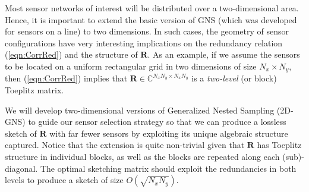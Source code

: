 Most sensor networks of interest will be distributed over a two-dimensional area. Hence, it is important to extend the basic version of GNS (which was developed for sensors on a line) to two dimensions. In such cases, the geometry of sensor configurations have very interesting implications on the redundancy relation (\ref{eqn:CorrRed}) and the structure of $\mathbf{R}$. As an example, if we assume the sensors to be located on a uniform rectangular grid in two dimensions of size $N_x\times N_y$, then (\ref{eqn:CorrRed}) implies that $\mathbf{R}\in \mathbb{C}^{N_xN_y \times N_xN_y}$ is a {\em two-level} (or block) Toeplitz matrix. 

\noindent We will develop two-dimensional versions of Generalized Nested Sampling (2D-GNS) to guide our sensor selection strategy so that we can produce a lossless sketch of $\mathbf{R}$ with far fewer sensors by exploiting its unique algebraic structure captured.%
Notice that the extension is quite non-trivial given that $\mathbf{R}$ has Toeplitz structure in individual blocks, as well as the blocks are repeated along each (sub)-diagonal. The optimal sketching matrix should exploit the redundancies in both levels to produce a sketch of size $O(\sqrt{N_xN_y})$. 

